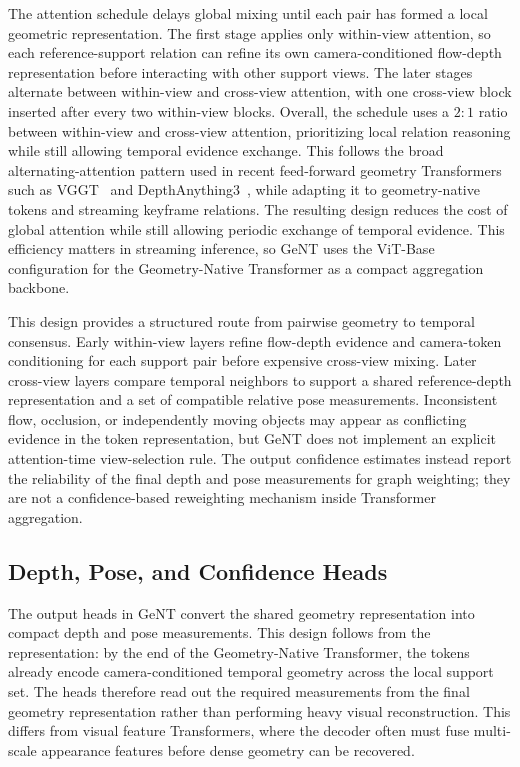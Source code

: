 The attention schedule delays global mixing until each pair has formed a local geometric representation.
The first stage applies only within-view attention, so each reference-support relation can refine its own camera-conditioned flow-depth representation before interacting with other support views.
The later stages alternate between within-view and cross-view attention, with one cross-view block inserted after every two within-view blocks.
Overall, the schedule uses a $2{:}1$ ratio between within-view and cross-view attention, prioritizing local relation reasoning while still allowing temporal evidence exchange.
This follows the broad alternating-attention pattern used in recent feed-forward geometry Transformers such as VGGT~\cite{wang2025vggt} and DepthAnything3~\cite{lin2026depth}, while adapting it to geometry-native tokens and streaming keyframe relations.
The resulting design reduces the cost of global attention while still allowing periodic exchange of temporal evidence.
This efficiency matters in streaming inference, so GeNT uses the ViT-Base configuration for the Geometry-Native Transformer as a compact aggregation backbone.

This design provides a structured route from pairwise geometry to temporal consensus.
Early within-view layers refine flow-depth evidence and camera-token conditioning for each support pair before expensive cross-view mixing.
Later cross-view layers compare temporal neighbors to support a shared reference-depth representation and a set of compatible relative pose measurements.
Inconsistent flow, occlusion, or independently moving objects may appear as conflicting evidence in the token representation, but GeNT does not implement an explicit attention-time view-selection rule.
The output confidence estimates instead report the reliability of the final depth and pose measurements for graph weighting; they are not a confidence-based reweighting mechanism inside Transformer aggregation.

\subsection{Depth, Pose, and Confidence Heads}
The output heads in GeNT convert the shared geometry representation into compact depth and pose measurements.
This design follows from the representation: by the end of the Geometry-Native Transformer, the tokens already encode camera-conditioned temporal geometry across the local support set.
The heads therefore read out the required measurements from the final geometry representation rather than performing heavy visual reconstruction.
This differs from visual feature Transformers, where the decoder often must fuse multi-scale appearance features before dense geometry can be recovered.

